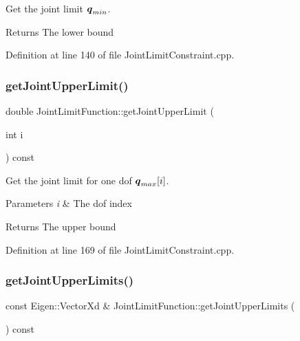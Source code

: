 Get the joint limit $ \mbox{\boldmath${q}$}_{min} $.

\begin{DoxyReturn}{Returns}
The lower bound 
\end{DoxyReturn}


Definition at line 140 of file Joint\+Limit\+Constraint.\+cpp.

\hypertarget{classocra_1_1JointLimitFunction_ae39c838b6618f3d1dded5aad16751e60}{}\label{classocra_1_1JointLimitFunction_ae39c838b6618f3d1dded5aad16751e60} 
\subsubsection{\texorpdfstring{get\+Joint\+Upper\+Limit()}{getJointUpperLimit()}}
{\footnotesize\ttfamily double Joint\+Limit\+Function\+::get\+Joint\+Upper\+Limit (\begin{DoxyParamCaption}\item[{int}]{i }\end{DoxyParamCaption}) const}

Get the joint limit for one dof $ \mbox{\boldmath${q}$}_{max}[i] $.


\begin{DoxyParams}{Parameters}
{\em i} & The dof index \\
\hline
\end{DoxyParams}
\begin{DoxyReturn}{Returns}
The upper bound 
\end{DoxyReturn}


Definition at line 169 of file Joint\+Limit\+Constraint.\+cpp.

\hypertarget{classocra_1_1JointLimitFunction_aeed410787750256bdd52fdd5ca3c519f}{}\label{classocra_1_1JointLimitFunction_aeed410787750256bdd52fdd5ca3c519f} 
\subsubsection{\texorpdfstring{get\+Joint\+Upper\+Limits()}{getJointUpperLimits()}}
{\footnotesize\ttfamily const Eigen\+::\+Vector\+Xd \& Joint\+Limit\+Function\+::get\+Joint\+Upper\+Limits (\begin{DoxyParamCaption}{ }\end{DoxyParamCaption}) const}

